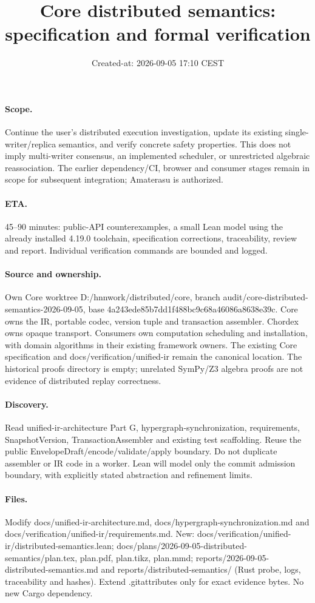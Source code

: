\documentclass[11pt,a4paper]{article}
\title{Core distributed semantics: specification and formal verification}
\date{Created-at: 2026-09-05 17:10 CEST}
\begin{document}
\maketitle
\paragraph{Scope.}
Continue the user's distributed execution investigation, update its existing
single-writer/replica semantics, and verify concrete safety properties. This
does not imply multi-writer consensus, an implemented scheduler, or unrestricted
algebraic reassociation. The earlier dependency/CI, browser and consumer stages
remain in scope for subsequent integration; Amaterasu is authorized.
\paragraph{ETA.}
45--90 minutes: public-API counterexamples, a small Lean model using the
already installed 4.19.0 toolchain, specification corrections, traceability,
review and report. Individual verification commands are bounded and logged.
\paragraph{Source and ownership.}
Own Core worktree D:/hnnwork/distributed/core, branch
audit/core-distributed-semantics-2026-09-05, base 4a243ede85b7dd1f488bc9c68a46086a8638e39c.
Core owns the IR, portable codec, version tuple and transaction assembler.
Chordex owns opaque transport. Consumers own computation scheduling and
installation, with domain algorithms in their existing framework owners.
The existing Core specification and docs/verification/unified-ir remain the
canonical location. The historical proofs directory is empty; unrelated
SymPy/Z3 algebra proofs are not evidence of distributed replay correctness.
\paragraph{Discovery.}
Read unified-ir-architecture Part G, hypergraph-synchronization, requirements,
SnapshotVersion, TransactionAssembler and existing test scaffolding. Reuse the
public EnvelopeDraft/encode/validate/apply boundary. Do not duplicate assembler
or IR code in a worker. Lean will model only the commit admission boundary,
with explicitly stated abstraction and refinement limits.
\paragraph{Files.}
Modify docs/unified-ir-architecture.md, docs/hypergraph-synchronization.md and
docs/verification/unified-ir/requirements.md. New:
docs/verification/unified-ir/distributed-semantics.lean;
docs/plans/2026-09-05-distributed-semantics/plan.tex, plan.pdf, plan.tikz, plan.mmd;
reports/2026-09-05-distributed-semantics.md and
reports/distributed-semantics/ (Rust probe, logs, traceability and hashes).
Extend .gitattributes only for exact evidence bytes. No new Cargo dependency.
\end{document}
